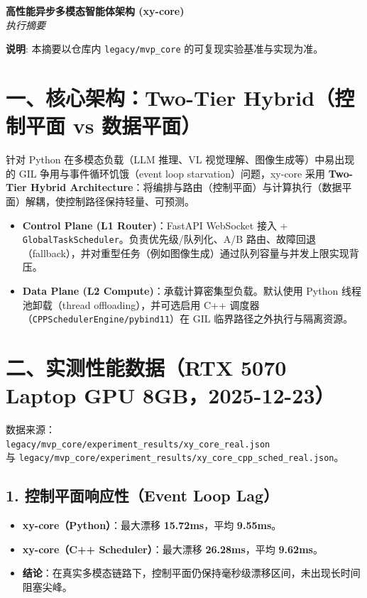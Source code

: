 \documentclass[a4paper,10pt]{ctexart}
\newenvironment{tightitemize}
{ \begin{itemize}
    \setlength{\itemsep}{0pt}
    \setlength{\parskip}{0pt}
    \setlength{\parsep}{0pt}
}
{ \end{itemize} }
\begin{document}
\begin{center}
    {\LARGE \textbf{高性能异步多模态智能体架构 (xy-core)}} \\
    \vspace{0.2cm}
    {\large \textit{执行摘要}}
\end{center}

\vspace{0.1cm}
\noindent\textbf{说明}: 本摘要以仓库内 \texttt{legacy/mvp\_core} 的可复现实验基准与实现为准。

\vspace{0.3cm}

\section{一、核心架构：Two-Tier Hybrid（控制平面 vs 数据平面）}
针对 Python 在多模态负载（LLM 推理、VL 视觉理解、图像生成等）中易出现的 GIL 争用与事件循环饥饿（event loop starvation）问题，xy-core 采用 \textbf{Two-Tier Hybrid Architecture}：将编排与路由（控制平面）与计算执行（数据平面）解耦，使控制路径保持轻量、可预测。

\begin{tightitemize}
    \item \textbf{Control Plane (L1 Router)}：FastAPI WebSocket 接入 + \texttt{GlobalTaskScheduler}。负责优先级/队列化、A/B 路由、故障回退（fallback），并对重型任务（例如图像生成）通过队列容量与并发上限实现背压。
    \item \textbf{Data Plane (L2 Compute)}：承载计算密集型负载。默认使用 Python 线程池卸载（thread offloading），并可选启用 C++ 调度器（\texttt{CPPSchedulerEngine/pybind11}）在 GIL 临界路径之外执行与隔离资源。
\end{tightitemize}

\section{二、实测性能数据（RTX 5070 Laptop GPU 8GB，2025-12-23）}
数据来源：\\
\texttt{legacy/mvp\_core/experiment\_results/xy\_core\_real.json} \\
与 \texttt{legacy/mvp\_core/experiment\_results/xy\_core\_cpp\_sched\_real.json}。

\subsection{1. 控制平面响应性（Event Loop Lag）}
\begin{tightitemize}
    \item \textbf{xy-core（Python）}：最大漂移 \textbf{15.72ms}，平均 \textbf{9.55ms}。
    \item \textbf{xy-core（C++ Scheduler）}：最大漂移 \textbf{26.28ms}，平均 \textbf{9.62ms}。
    \item \textbf{结论}：在真实多模态链路下，控制平面仍保持毫秒级漂移区间，未出现长时间阻塞尖峰。
\end{tightitemize}
\end{document}
